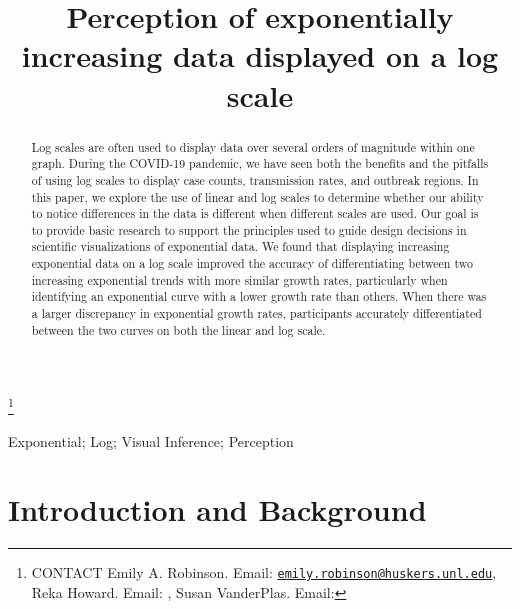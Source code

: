 \documentclass[]{interact}
\theoremstyle{plain}%
\theoremstyle{definition}
\theoremstyle{remark}
\begin{document}

\title{Perception of exponentially increasing data displayed on a log scale}


\author{
}

\thanks{CONTACT Emily A. Robinson. Email: \href{mailto:emily.robinson@huskers.unl.edu}{\nolinkurl{emily.robinson@huskers.unl.edu}}, Reka Howard. Email: , Susan VanderPlas. Email: }

\maketitle

\begin{abstract}
Log scales are often used to display data over several orders of
magnitude within one graph. During the COVID-19 pandemic, we have seen
both the benefits and the pitfalls of using log scales to display case
counts, transmission rates, and outbreak regions. In this paper, we
explore the use of linear and log scales to determine whether our
ability to notice differences in the data is different when different
scales are used. Our goal is to provide basic research to support the
principles used to guide design decisions in scientific visualizations
of exponential data. We found that displaying increasing exponential
data on a log scale improved the accuracy of differentiating between two
increasing exponential trends with more similar growth rates,
particularly when identifying an exponential curve with a lower growth
rate than others. When there was a larger discrepancy in exponential
growth rates, participants accurately differentiated between the two
curves on both the linear and log scale.
\end{abstract}

\begin{keywords}
Exponential; Log; Visual Inference; Perception
\end{keywords}

\hypertarget{introduction-and-background}{%
\section{Introduction and
Background}\label{introduction-and-background}}
\end{document}
